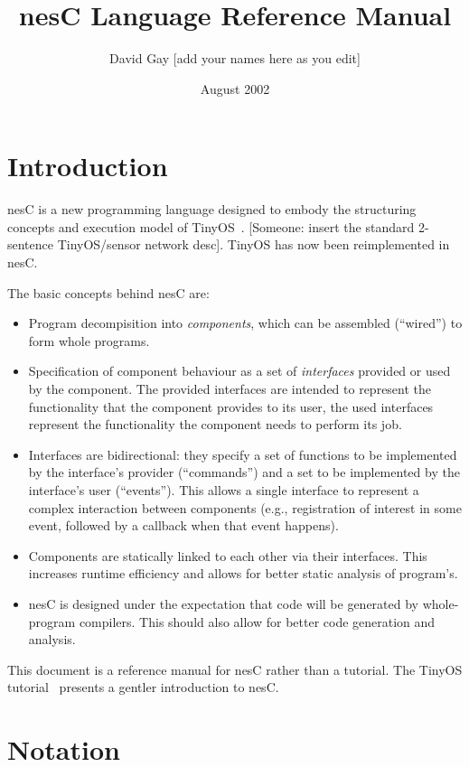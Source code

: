 \documentclass[11pt]{article}
\newcommand{\nesc}{nesC\xspace}
\begin{document}
\title{\nesc Language Reference Manual}
\author{David Gay [add your names here as you edit]}
\date{August 2002}

\maketitle

\section{Introduction}

\nesc is a new programming language designed to embody the structuring
concepts and execution model of TinyOS~\cite{tinyos}. [Someone: insert the
standard 2-sentence TinyOS/sensor network desc]. TinyOS has now been
reimplemented in \nesc.

The basic concepts behind \nesc are:
\begin{itemize}
\item Program decompisition into \emph{components}, which can be assembled
(``wired'') to form whole programs.
\item Specification of component behaviour as a set of \emph{interfaces}
provided or used by the component. The provided interfaces are intended
to represent the functionality that the component provides to its user,
the used interfaces represent the functionality the component needs to
perform its job.
\item Interfaces are bidirectional: they specify a set of functions to be
implemented by the interface's provider (``commands'') and a set to be
implemented by the interface's user (``events''). This allows a single
interface to represent a complex interaction between components (e.g.,
registration of interest in some event, followed by a callback when that
event happens).
\item Components are statically linked to each other via their interfaces.
This increases runtime efficiency and allows for better static analysis of 
program's.
\item \nesc is designed under the expectation that code will be generated
by whole-program compilers. This should also allow for better code 
generation and analysis.
\end{itemize}

This document is a reference manual for \nesc rather than a tutorial. The
TinyOS tutorial~\cite{tinyos-tutorial} presents a gentler introduction
to \nesc.

\section{Notation}
\end{document}

